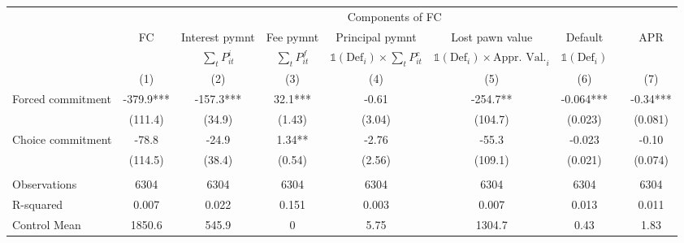\begin{tabular}{lcccccccc}
\toprule
      &       & \multicolumn{5}{c}{Components of FC}  &       &  \\
\cmidrule{3-7}      & FC    & Interest pymnt & Fee pymnt & Principal pymnt & Lost pawn value & Default &       & APR \\
\cmidrule{2-2}\cmidrule{9-9}      &       & $\sum_t P^i_{it}$ & $\sum_t P^f_{it}$ & $\mathds{1}(\text{Def}_i)\times\sum_t P^c_{it}$ & $\mathds{1}(\text{Def}_i)\times \text{Appr. Val.}_i$ & $\mathds{1}(\text{Def}_i)$ &       &  \\
\midrule
      & (1)   & (2)   & (3)   & (4)   & (5)   & (6)   &       & (7) \\
\midrule
\midrule
Forced commitment & -379.9*** & -157.3*** & 32.1*** & -0.61 & -254.7** & -0.064*** &       & -0.34*** \\
      & (111.4) & (34.9) & (1.43) & (3.04) & (104.7) & (0.023) &       & (0.081) \\
Choice commitment & -78.8 & -24.9 & 1.34** & -2.76 & -55.3 & -0.023 &       & -0.10 \\
      & (114.5) & (38.4) & (0.54) & (2.56) & (109.1) & (0.021) &       & (0.074) \\
      &       &       &       &       &       &       &       &  \\
\midrule
Observations & 6304  & 6304  & 6304  & 6304  & 6304  & 6304  &       & 6304 \\
R-squared & 0.007 & 0.022 & 0.151 & 0.003 & 0.007 & 0.013 &       & 0.011 \\
Control Mean & 1850.6 & 545.9 & 0     & 5.75  & 1304.7 & 0.43  &       & 1.83 \\
\bottomrule
\bottomrule
\end{tabular}%
